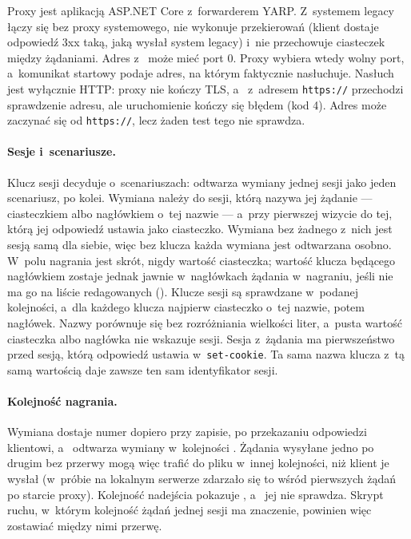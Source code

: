 Proxy jest aplikacją ASP.NET Core z~forwarderem YARP. Z~systemem legacy łączy się bez
proxy systemowego, nie wykonuje przekierowań (klient dostaje odpowiedź 3xx taką, jaką
wysłał system legacy) i~nie przechowuje ciasteczek między żądaniami. Adres
z~ może mieć port 0. Proxy wybiera wtedy wolny port, a~komunikat
startowy podaje adres, na którym faktycznie nasłuchuje. Nasłuch jest wyłącznie HTTP: proxy
nie kończy TLS, a~ z~adresem \texttt{https://} przechodzi sprawdzenie
adresu, ale uruchomienie kończy się błędem (kod 4). Adres  może zaczynać
się od \texttt{https://}, lecz żaden test tego nie sprawdza.

\paragraph{Sesje i~scenariusze.} Klucz sesji decyduje o~scenariuszach: 
odtwarza wymiany jednej sesji jako jeden scenariusz, po kolei. Wymiana należy do sesji, którą
nazywa jej żądanie --- ciasteczkiem albo nagłówkiem o~tej nazwie --- a~przy pierwszej wizycie
do tej, którą jej odpowiedź ustawia jako ciasteczko. Wymiana bez żadnego z~nich jest sesją
samą dla siebie, więc bez klucza każda wymiana jest odtwarzana osobno. W~polu 
nagrania jest skrót, nigdy wartość ciasteczka; wartość klucza będącego nagłówkiem zostaje
jednak jawnie w~nagłówkach żądania w~nagraniu, jeśli nie ma go na liście redagowanych
(). Klucze sesji są sprawdzane w~podanej
kolejności, a~dla każdego klucza najpierw ciasteczko o~tej nazwie, potem nagłówek. Nazwy
porównuje się bez rozróżniania wielkości liter, a~pusta wartość ciasteczka albo nagłówka nie
wskazuje sesji. Sesja z~żądania ma pierwszeństwo przed sesją, którą odpowiedź ustawia
w~\texttt{set-cookie}. Ta sama nazwa klucza z~tą samą wartością daje zawsze ten sam
identyfikator sesji.

\paragraph{Kolejność nagrania.} Wymiana dostaje numer  dopiero przy zapisie,
po przekazaniu odpowiedzi klientowi, a~ odtwarza wymiany w~kolejności
. Żądania wysyłane jedno po drugim bez przerwy mogą więc trafić do pliku
w~innej kolejności, niż klient je wysłał (w~próbie na lokalnym serwerze zdarzało się to
wśród pierwszych żądań po starcie proxy). Kolejność nadejścia pokazuje ,
a~ jej nie sprawdza. Skrypt ruchu, w~którym kolejność żądań jednej
sesji ma znaczenie, powinien więc zostawiać między nimi przerwę.

